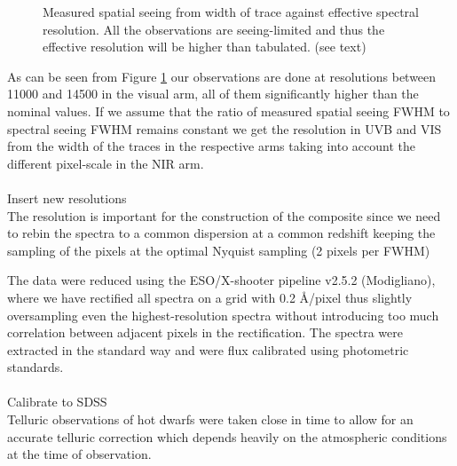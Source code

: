 \documentclass[iop]{emulateapj}
\begin{document}
\begin{figure}
\caption{Measured spatial seeing from width of trace against effective spectral resolution. All the observations are seeing-limited and thus the effective resolution will be higher than tabulated. (see text)\label{fig1}}
\end{figure}

As can be seen from Figure \ref{fig1} our observations are done at resolutions between 11000 and 14500 in the visual arm, all of them significantly higher than the nominal values. If we assume that the ratio of measured spatial seeing FWHM to spectral seeing FWHM remains constant we get the resolution in UVB and VIS from the width of the traces in the respective arms taking into account the different pixel-scale in the NIR arm.\\ \\
Insert new resolutions
\\

The resolution is important for the construction of the composite since we need to rebin the spectra to a common dispersion at a common redshift keeping the sampling of the pixels at the optimal Nyquist sampling (2 pixels per FWHM)

The data were reduced using the ESO/X-shooter pipeline v2.5.2 (Modigliano), where we have rectified all spectra on a grid with 0.2 \AA/pixel thus slightly oversampling even the highest-resolution spectra without introducing too much correlation between adjacent pixels in the rectification. The spectra were extracted in the standard way and were flux calibrated using photometric standards. \\ \\

Calibrate to SDSS \\


Telluric observations of hot dwarfs were taken close in time to allow for an accurate telluric correction which depends heavily on the atmospheric conditions at the time of observation.



\newcommand\sk[2]{Sk\,{$-#1{^\circ}#2$}}
\newcommand\tnc{\,\tablenotemark{c}}
\newcommand\tnd{\,\tablenotemark{d}}
\end{document}
